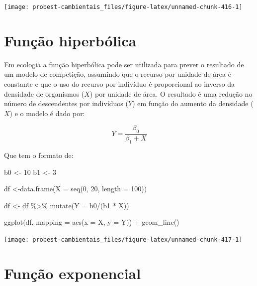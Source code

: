 \documentclass[
]{book}
\newenvironment{Shaded}{\begin{snugshade}}{\end{snugshade}}
\newcommand{\AttributeTok}[1]{\textcolor[rgb]{0.77,0.63,0.00}{#1}}
\newcommand{\DecValTok}[1]{\textcolor[rgb]{0.00,0.00,0.81}{#1}}
\newcommand{\FunctionTok}[1]{\textcolor[rgb]{0.00,0.00,0.00}{#1}}
\newcommand{\NormalTok}[1]{#1}
\newcommand{\OtherTok}[1]{\textcolor[rgb]{0.56,0.35,0.01}{#1}}
\newcommand{\SpecialCharTok}[1]{\textcolor[rgb]{0.00,0.00,0.00}{#1}}
\begin{document}
\begin{center}\texttt{[image: probest-cambientais\_files/figure-latex/unnamed-chunk-416-1]} \end{center}

\hypertarget{funuxe7uxe3o-hiperbuxf3lica}{%
\section{Função hiperbólica}\label{funuxe7uxe3o-hiperbuxf3lica}}

Em ecologia a função hiperbólica pode ser utilizada para prever o resultado de um modelo de competição, assumindo que o recurso por unidade de área é constante e que o uso do recurso por indivíduo é proporcional ao inverso da densidade de organismos (\(X\)) por unidade de área. O resultado é uma redução no número de descendentes por indivíduos (\(Y\)) em função do aumento da densidade (\(X\)) e o modelo é dado por:

\[ Y = \frac{\beta_0}{\beta_1 + X}\]

Que tem o formato de:

\begin{Shaded}
\begin{Highlighting}[]
\NormalTok{b0 }\OtherTok{\textless{}{-}} \DecValTok{10}
\NormalTok{b1 }\OtherTok{\textless{}{-}} \DecValTok{3}

\NormalTok{df }\OtherTok{\textless{}{-}}\FunctionTok{data.frame}\NormalTok{(}\AttributeTok{X =} \FunctionTok{seq}\NormalTok{(}\DecValTok{0}\NormalTok{, }\DecValTok{20}\NormalTok{, }\AttributeTok{length =} \DecValTok{100}\NormalTok{))}

\NormalTok{df }\OtherTok{\textless{}{-}}\NormalTok{ df }\SpecialCharTok{\%\textgreater{}\%} \FunctionTok{mutate}\NormalTok{(}\AttributeTok{Y =}\NormalTok{ b0}\SpecialCharTok{/}\NormalTok{(b1 }\SpecialCharTok{*}\NormalTok{ X))}

\FunctionTok{ggplot}\NormalTok{(df, }\AttributeTok{mapping =} \FunctionTok{aes}\NormalTok{(}\AttributeTok{x =}\NormalTok{ X, }\AttributeTok{y =}\NormalTok{ Y)) }\SpecialCharTok{+}
  \FunctionTok{geom\_line}\NormalTok{()}
\end{Highlighting}
\end{Shaded}

\begin{center}\texttt{[image: probest-cambientais\_files/figure-latex/unnamed-chunk-417-1]} \end{center}

\hypertarget{funuxe7uxe3o-exponencial}{%
\section{Função exponencial}\label{funuxe7uxe3o-exponencial}}
\end{document}
